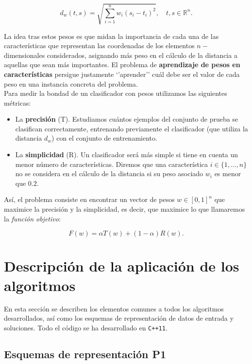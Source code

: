 \documentclass[12pt]{article}
\begin{document}
\[
    d_w(t, s) = \sqrt{\sum_{i=1}^n w_i (s_i - t_i)^2}, \quad t, s \in \mathbb{R}^n.
\]
\vspace{.5em}

La idea tras estos pesos es que midan la importancia de cada una de las características que representan las coordenadas de los elementos $n-$dimensionales considerados, asignando más peso en el cálculo de la distancia a aquellas que sean más importantes. El problema de \textbf{aprendizaje de pesos en características} persigue justamente `'aprender'' cuál debe ser el valor de cada peso en una instancia concreta del problema.\\

Para medir la bondad de un clasificador con pesos utilizamos las siguientes métricas:

\begin{itemize}
	\item La \textbf{precisión} (T). Estudiamos cuántos ejemplos del conjunto de prueba se clasifican correctamente, entrenando previamente el clasificador (que utiliza la distancia $d_w$) con el conjunto de entrenamiento.
	\item La \textbf{simplicidad} (R). Un clasificador será más simple si tiene en cuenta un menor número de características. Diremos que una característica $i \in \{1, \dots, n\}$ no se considera en el cálculo de la distancia si su peso asociado $w_i$ es menor que $0.2$.
\end{itemize}

Así, el problema consiste en encontrar un vector de pesos $w \in [0,1]^n$ que maximice la precisión y la simplicidad, es decir, que maximice lo que llamaremos la \textit{función objetivo}:

\[
    F(w) = \alpha T(w) + (1 - \alpha) R(w).
\]

\newpage

\section{Descripción de la aplicación de los algoritmos}

En esta sección se describen los elementos comunes a todos los algoritmos desarrollados, así como los esquemas de representación de datos de entrada y soluciones. Todo el código se ha desarrollado en \verb|C++11|.


\subsection*{{\color{red}Esquemas de representación P1}}
\end{document}
